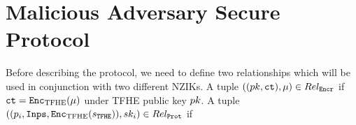 \section{Malicious Adversary Secure Protocol}
\newcommand{\relEncr}{\proofRel_\texttt{Encr}}
\newcommand{\relProt}{\proofRel_\texttt{Prot}}
\newcommand{\relOpen}{\proofRel_\texttt{Open}}
\newcommand{\proofOpen}[1]{\pi_{#1}^{\texttt{Open}}}
\newcommand{\proofEncr}[1]{\pi_{#1}^{\texttt{Encr}}}
\newcommand{\proofProt}[1]{\pi_{#1}^{\texttt{Prot}}}
\newcommand{\inCTList}{\texttt{Inps}}
\newcommand{\decryptShares}{\texttt{Shares}}
Before describing the protocol, we need to define two relationships which will be used in
conjunction with two different NZIKs. A tuple $((\TFHEPk, \ct), \mu) \in \relEncr$ if
$\texttt{ct} = \texttt{Enc}_{\mathrm{TFHE}}(\mu)$ under TFHE public key $pk$.
A tuple $((p_i, \inCTList, \Enc(s_\TFHE)), \TFHESk_i) \in \relProt$ if

